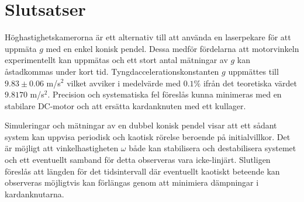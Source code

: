 \documentclass[12pt,a4paper]{article}
\makeatletter
\newcommand*{\rom}[1]{\expandafter\@slowromancap\romannumeral #1@}
\makeatother
\begin{document}






\vspace{-2px}
\section{Slutsatser}
Höghastighetskamerorna är ett alternativ till att använda en laserpekare för att uppmäta $g$ med en enkel konisk pendel. Dessa medför fördelarna att motorvinkeln experimentellt kan uppmätas och ett stort antal mätningar av $g$ kan åstadkommas under kort tid. Tyngdaccelerationskonstanten $g$ uppmättes till $9.83 \pm 0.06$ m/s$^2$ vilket avviker i medelvärde med $0.1\%$ ifrån det teoretiska värdet $9.8170$ m/s$^2$. Precision och systematiska fel föreslås kunna minimeras med en stabilare DC-motor och att ersätta kardanknuten med ett kullager.

Simuleringar och mätningar av en dubbel konisk pendel visar att ett sådant system kan uppvisa periodisk och kaotisk rörelse beroende på initialvillkor. Det är möjligt att vinkelhastigheten $\omega$ både kan stabilisera och destabilisera systemet och ett eventuellt samband för detta observeras vara icke-linjärt. Slutligen föreslås att längden för det tidsintervall där eventuellt kaotiskt beteende kan observeras möjligtvis kan förlängas genom att minimiera dämpningar i kardanknutarna.
\end{document}
